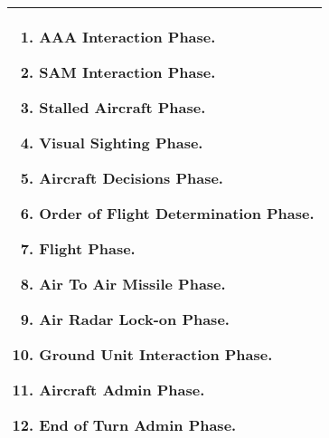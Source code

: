 \begin{onecolumntablefloat}
\begin{onecolumntable}
\begin{tabularx}{0.8\linewidth}{X}
\toprule

\begin{enumerate}
    \item AAA Interaction Phase.
    \item SAM Interaction Phase.
    \item Stalled Aircraft Phase.
    \item Visual Sighting Phase.
    \item Aircraft Decisions Phase.
    \item Order of Flight Determination Phase.
    \item Flight Phase.
    \item Air To Air Missile Phase.
    \item Air Radar Lock-on Phase.
    \item Ground Unit Interaction Phase.
    \item Aircraft Admin Phase.
    \item End of Turn Admin Phase.
\end{enumerate}

\\
\bottomrule
\end{tabularx}
\end{onecolumntable}
\end{onecolumntablefloat}
